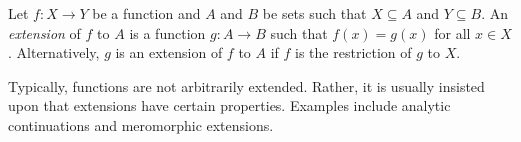 \documentclass[12pt]{article}
\begin{document}
Let $f\colon X \to Y$ be a function and $A$ and $B$ be sets such that $X\subseteq A$ and $Y\subseteq B$.  An \emph{extension} of $f$ to $A$ is a function $g\colon A \to B$ such that $f(x)=g(x)$ for all $x\in X$.  Alternatively, $g$ is an extension of $f$ to $A$ if $f$ is the restriction of $g$ to $X$.

Typically, functions are not arbitrarily extended.  Rather, it is usually insisted upon that extensions have certain properties.  Examples include analytic continuations and meromorphic extensions. 
\end{document}
